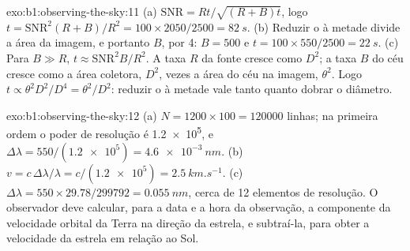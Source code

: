 \begin{solution}{exo:b1:observing-the-sky:11}
(a) $\mathrm{SNR} = Rt/\sqrt{(R + B)t}$, logo $t = \mathrm{SNR}^2(R + B)/R^2
= 100\times2050/2500 = \qty{82}{s}$. (b) Reduzir o  à metade divide a
área da imagem, e portanto $B$, por 4: $B = 500$ e $t = 100\times550/2500 =
\qty{22}{s}$.
(c) Para $B \gg R$, $t \approx \mathrm{SNR}^2B/R^2$. A taxa $R$ da fonte cresce como $D^2$;
a taxa $B$ do céu cresce como a área coletora, $D^2$, vezes a área do céu na imagem,
$\theta^2$. Logo $t \propto
\theta^2D^2/D^4 = \theta^2/D^2$: reduzir o  à metade vale tanto quanto
dobrar o diâmetro.
\end{solution}

\begin{solution}{exo:b1:observing-the-sky:12}
(a) $N = 1200\times100 = \num{120000}$ linhas; na primeira ordem o poder de
resolução é \num{1.2e5}, e $\Delta\lambda = 550/(\num{1.2e5}) =
\qty{4.6e-3}{nm}$. (b) $v = c\,\Delta\lambda/\lambda = c/(\num{1.2e5}) =
\qty{2.5}{km.s^{-1}}$. (c) $\Delta\lambda = 550\times29.78/\num{299792} =
\qty{0.055}{nm}$, cerca de 12 elementos de resolução. O observador deve calcular,
para a data e a hora da observação, a componente da velocidade orbital da Terra
na direção da estrela, e subtraí-la, para obter a velocidade da estrela em
relação ao Sol.
\end{solution}

